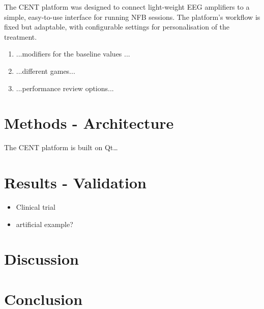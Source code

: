 \documentclass[fleqn,10pt]{wlpeerj}
\begin{document}
The CENT platform was designed to connect light-weight EEG amplifiers to a simple, easy-to-use interface for running NFB sessions. The platform's workflow is fixed but adaptable, with configurable settings for personalisation of the treatment. 
\begin{enumerate}
	\item ...modifiers for the baseline values ...
	\item ...different games...
	\item ...performance review options...
\end{enumerate}




\section{Methods - Architecture}

The CENT platform is built on Qt…




\section{Results - Validation}
\label{cent:trial}

\begin{itemize}
	\item Clinical trial
	
	\item artificial example?
	
\end{itemize}





\section{Discussion}

\lipsum[10] %





\section{Conclusion}
\end{document}
